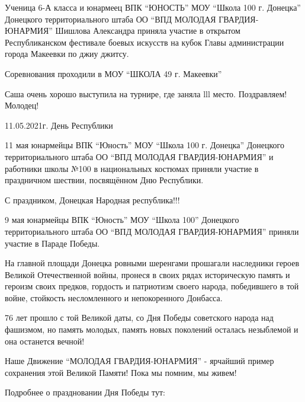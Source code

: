 Ученица 6-А класса и юнармеец ВПК \enquote{ЮНОСТЬ} МОУ \enquote{Школа 100 г.
Донецка} Донецкого территориального штаба ОО \enquote{ВПД МОЛОДАЯ
ГВАРДИЯ-ЮНАРМИЯ} Шишлова Александра приняла участие в открытом Республиканском
фестивале боевых искусств на кубок Главы администрации города Макеевки по джиу
джитсу.

Соревнования проходили в МОУ \enquote{ШКОЛА 49 г. Макеевки}

Саша очень хорошо выступила на турнире, где заняла lll место. Поздравляем! Молодец!


11.05.2021г. День Республики

11 мая юнармейцы ВПК \enquote{Юность} МОУ \enquote{Школа 100 г. Донецка} Донецкого
территориального штаба ОО \enquote{ВПД МОЛОДАЯ ГВАРДИЯ-ЮНАРМИЯ} и работники школы №100
в национальных костюмах приняли участие в праздничном шествии, посвящённом Дню
Республики.

С праздником, Донецкая Народная республика!!!


  9 мая юнармейцы ВПК \enquote{Юность} МОУ \enquote{Школа 100}
Донецкого территориального штаба ОО \enquote{ВПД МОЛОДАЯ ГВАРДИЯ-ЮНАРМИЯ}
приняли участие в Параде Победы.

На главной площади Донецка ровными шеренгами прошагали наследники героев
Великой Отечественной войны, пронеся в своих рядах историческую память и
героизм своих предков, гордость и патриотизм своего народа, победившего в той
войне, стойкость несломленного и непокоренного Донбасса.

76 лет прошло с той Великой даты, со Дня Победы советского народа над фашизмом,
но память молодых, память новых поколений осталась незыблемой и она останется
вечной!

Наше Движение \enquote{МОЛОДАЯ ГВАРДИЯ-ЮНАРМИЯ} - ярчайший пример сохранения
этой Великой Памяти!  Пока мы помним, мы живем!

Подробнее о праздновании Дня Победы тут: 
